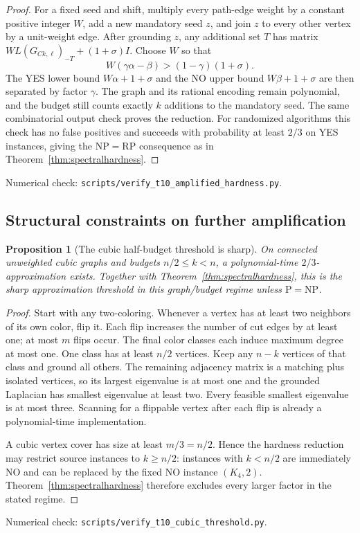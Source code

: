 \documentclass[11pt]{article}
\newtheorem{proposition}[theorem]{Proposition}
\begin{document}
\begin{proof}
For a fixed seed and shift, multiply every path-edge weight by
a constant positive integer $W$, add a new mandatory seed $z$,
and join $z$ to every other vertex by a unit-weight edge.
After grounding $z$, any additional set $T$ has matrix
$W L(G_{Ck,\ell})_{-T}+(1+\sigma)I$.
Choose $W$ so that
\[
 W(\gamma\alpha-\beta)>(1-\gamma)(1+\sigma).
\]
The YES lower bound $W\alpha+1+\sigma$ and the NO upper bound
$W\beta+1+\sigma$ are then separated by factor $\gamma$.
The graph and its rational encoding remain polynomial, and the
budget still counts exactly $k$ additions to the mandatory seed.
The same combinatorial output check proves the reduction.
For randomized algorithms this check has no false positives and
succeeds with probability at least $2/3$ on YES instances, giving
the $\mathrm{NP}=\mathrm{RP}$ consequence as in
Theorem~\ref{thm:spectralhardness}.
\end{proof}
\noindent Numerical check: \texttt{scripts/verify\_t10\_amplified\_hardness.py}.

\subsection{Structural constraints on further amplification}
\begin{proposition}[The cubic half-budget threshold is sharp]
\label{prop:cubicalgorithm}
On connected unweighted cubic graphs and budgets $n/2\leq k<n$,
a polynomial-time $2/3$-approximation exists. Together with
Theorem~\ref{thm:spectralhardness}, this is the sharp approximation
threshold in this graph/budget regime unless $\mathrm P=\mathrm{NP}$.
\end{proposition}
\begin{proof}
Start with any two-coloring. Whenever a vertex has at least two
neighbors of its own color, flip it. Each flip increases the number
of cut edges by at least one; at most $m$ flips occur. The final
color classes each induce maximum degree at most one. One class
has at least $n/2$ vertices. Keep any $n-k$ vertices of that class
and ground all others. The remaining adjacency matrix is a
matching plus isolated vertices, so its largest eigenvalue is at
most one and the grounded Laplacian has smallest eigenvalue at
least two. Every feasible smallest eigenvalue is at most three.
Scanning for a flippable vertex after each flip is already a
polynomial-time implementation.

A cubic vertex cover has size at least $m/3=n/2$. Hence the
hardness reduction may restrict source instances to $k\geq n/2$:
instances with $k<n/2$ are immediately NO and can be replaced by
the fixed NO instance $(K_4,2)$. Theorem~\ref{thm:spectralhardness}
therefore excludes every larger factor in the stated regime.
\end{proof}
\noindent Numerical check: \texttt{scripts/verify\_t10\_cubic\_threshold.py}.
\end{document}
